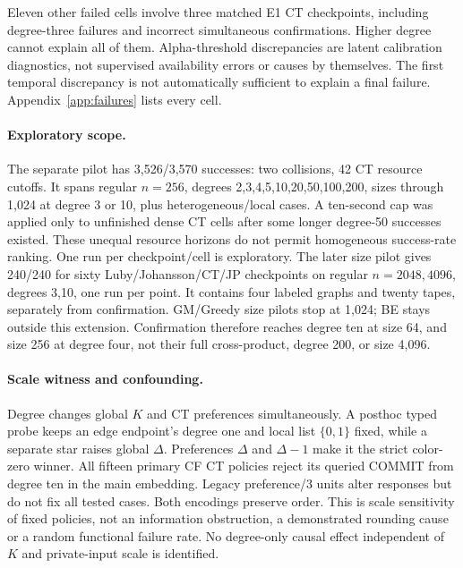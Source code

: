 \documentclass[10pt]{article}
\begin{document}


Eleven other failed cells involve three matched E1 CT checkpoints, including
degree-three failures and incorrect simultaneous confirmations. Higher degree
cannot explain all of them. Alpha-threshold discrepancies are latent
calibration diagnostics, not supervised availability errors or causes by
themselves. The first temporal discrepancy is not automatically sufficient
to explain a final failure. Appendix~\ref{app:failures} lists every cell.

\paragraph{Exploratory scope.}
The separate pilot has 3,526/3,570 successes: two collisions, 42 CT resource
cutoffs. It spans regular $n=256$, degrees 2,3,4,5,10,20,50,100,200, sizes
through 1,024 at degree 3 or 10, plus heterogeneous/local cases. A ten-second
cap was applied only to unfinished dense CT cells after some longer degree-50
successes existed. These unequal resource horizons do not permit homogeneous
success-rate ranking. One run per checkpoint/cell is exploratory.
The later size pilot gives 240/240 for sixty Luby/Johansson/CT/JP checkpoints
on regular $n=2048,4096$, degrees 3,10, one run per point. It contains four
labeled graphs and twenty tapes, separately from confirmation. GM/Greedy
size pilots stop at 1,024; BE stays outside this extension.
Confirmation therefore reaches degree ten at size 64, and size 256 at degree
four, not their full cross-product, degree 200, or size 4,096.

\paragraph{Scale witness and confounding.}
Degree changes global $K$ and CT preferences simultaneously. A posthoc typed
probe keeps an edge endpoint's degree one and local list $\{0,1\}$ fixed,
while a separate star raises global $\Delta$. Preferences $\Delta$ and
$\Delta-1$ make it the strict color-zero winner. All fifteen primary CF CT
policies reject its queried COMMIT from degree ten in the main embedding.
Legacy preference/3 units alter responses but do not fix all tested cases.
Both encodings preserve order. This is scale sensitivity of fixed policies,
not an information obstruction, a demonstrated rounding cause or a random
functional failure rate. No degree-only causal effect independent of $K$
and private-input scale is identified.
\end{document}
